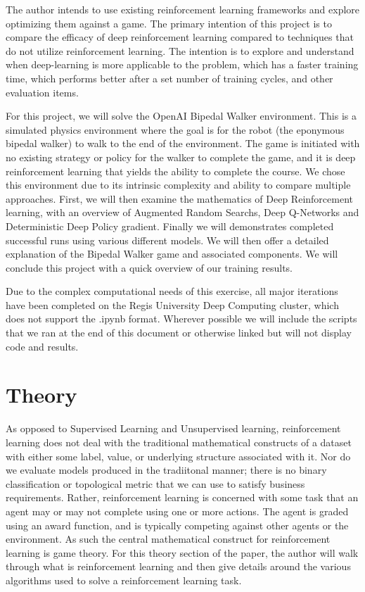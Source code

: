 \documentclass[man, 12pt]{apa6}
\begin{document}
The author intends to use existing reinforcement learning frameworks and explore optimizing them against a game. The primary intention of this project is to compare the efficacy of deep reinforcement learning compared to techniques that do not utilize reinforcement learning. The intention is to explore and understand when deep-learning is more applicable to the problem, which has a faster training time, which performs better after a set number of training cycles, and other evaluation items. 

For this project, we will solve the OpenAI Bipedal Walker environment. This is a simulated physics environment where the goal is for the robot (the eponymous bipedal walker) to walk to the end of the environment. The game is initiated with no existing strategy or policy for the walker to complete the game, and it is deep reinforcement learning that yields the ability to complete the course. We chose this environment due to its intrinsic complexity and ability to compare multiple approaches. First, we will then examine the mathematics of Deep Reinforcement learning, with an overview of Augmented Random Searchs, Deep Q-Networks and Deterministic Deep Policy gradient. Finally we will demonstrates completed successful runs using various different models. We will then offer a detailed explanation of the Bipedal Walker game and associated components. We will conclude this project with a quick overview of our training results. 

Due to the complex computational needs of this exercise, all major iterations have been completed on the Regis University Deep Computing cluster, which does not support the .ipynb format. Wherever possible we will include the scripts that we ran at the end of this document or otherwise linked but will not display code and results.


\section{Theory}
As opposed to Supervised Learning and Unsupervised learning, reinforcement learning does not deal with the traditional mathematical constructs of a dataset with either some label, value, or underlying structure associated with it. Nor do we evaluate models produced in the tradiitonal manner; there is no binary classification or topological metric that we can use to satisfy business requirements. Rather, reinforcement learning is concerned with some task that an agent may or may not complete using one or more actions. The agent is graded using an award function, and is typically competing against other agents or the environment. As such the central mathematical construct for reinforcement learning is game theory. For this theory section of the paper, the author will walk through what is reinforcement learning and then give details around the various algorithms used to solve a reinforcement learning task. 
\end{document}

